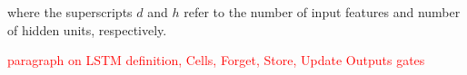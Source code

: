 \documentclass[12pt]{report}
\begin{document}
where the superscripts $d$ and $h$ refer to the number of input features and number of hidden units, respectively.



\textcolor{red}{paragraph on LSTM definition, Cells,  Forget, Store, Update Outputs gates}\\



%



\end{document}
